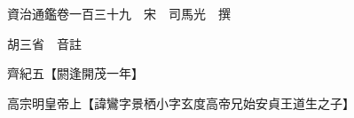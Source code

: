 










 


 
 


 

  
  
  
  
  





  
  
  
  
  
 
  

  

  
  
  



  

 
 

  
   




  

  
  


  　　資治通鑑卷一百三十九　宋　司馬光　撰

　　胡三省　音註

　　齊紀五【閼逢開茂一年】

　　高宗明皇帝上【諱鸞字景栖小字玄度高帝兄始安貞王道生之子】

